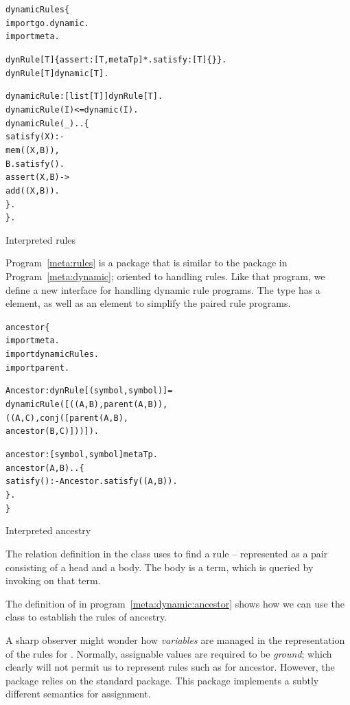 \begin{program}[bt]
\vspace{0.5ex}
\begin{alltt}
dynamicRules\{
  import go.dynamic.
  import meta.

  dynRule[T] \impl \{ assert:[T,metaTp]*. satisfy:[T]\{\} \}.
  dynRule[T] \impl dynamic[T].

  dynamicRule:[list[T]]\sconarrow{}dynRule[T].
  dynamicRule(I) <= dynamic(I).
  dynamicRule(_)..\{
    satisfy(X) :-
        mem((X,B)),
        B.satisfy().
    assert(X,B) ->
        add((X,B)).
  \}.
\}.
\end{alltt}
\vspace{-2ex}
\caption{Interpreted rules}
\label{meta:rules}
\end{program}

Program~\vref{meta:rules} is a package that is similar to the package in Program~\vref{meta:dynamic}; oriented to handling rules. Like that program, we define a new interface for handling dynamic rule programs. The  type has a  element, as well as an  element to simplify the paired rule programs. 

\begin{program}[bt]
\vspace{0.5ex}
\begin{alltt}
ancestor\{
  import meta.
  import dynamicRules.
  import parent.

  Ancestor:dynRule[(symbol,symbol)]=
      dynamicRule([((A,B),parent(A,B)),
                   ((A,C),conj([parent(A,B),
                                ancestor(B,C)]))]).

  ancestor:[symbol,symbol]\conarrow{}metaTp.
  ancestor(A,B)..\{
    satisfy() :- Ancestor.satisfy((A,B)).
  \}.
\}
\end{alltt}
\vspace{-2ex}
\caption{Interpreted ancestry}
\label{meta:dynamic:ancestor}
\end{program}

The  relation definition in the  class uses  to find a rule -- represented as a pair consisting of a head and a body. The body is a  term, which is queried by invoking  on that term. 

The definition of  in program~\vref{meta:dynamic:ancestor} shows how we can use the  class to establish the rules of ancestry.

A sharp observer might wonder how \emph{variables} are managed in the representation of the rules for . Normally, assignable values are required to be \emph{ground}; which clearly will not permit us to represent rules such as for ancestor. However, the  package relies on the standard  package. This package implements a subtly different semantics for assignment.

